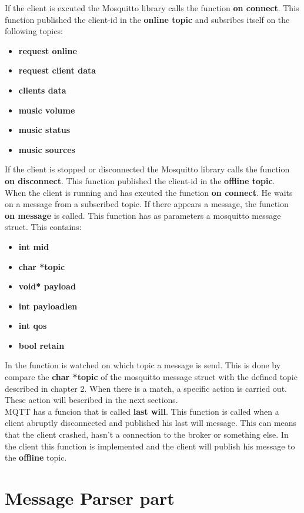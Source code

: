 If the client is excuted the Mosquitto library calls the function  
{\bf on connect}. This function published the client-id in the {\bf online topic } and subsribes itself on the following topics:
\small{
\begin{itemize} [noitemsep, nolistsep]
	\item {\bf request online}
	\item {\bf request client data}
	\item {\bf clients data}
	\item {\bf music volume}
	\item {\bf music status}
	\item {\bf music sources\\}
\end{itemize}
}
If the client is stopped or disconnected the Mosquitto library calls the function {\bf on disconnect}. This function published the client-id in the {\bf offline topic}.\\

When the client is running and has excuted the function {\bf on connect}. He waits on a message from a subscribed topic. If there appears a message, the function {\bf on message} is called. This function has as parameters a mosquitto message struct. This contains: 
\small{
\begin{itemize} [noitemsep, nolistsep]
	\item {\bf int mid}
	\item {\bf char *topic}
	\item {\bf void* payload}
	\item {\bf int payloadlen}
	\item {\bf int qos}
	\item {\bf bool retain\\}
\end{itemize}
}

In the function is watched on which topic a message is send. This is done by compare the {\bf char *topic} of the mosquitto message struct with the defined topic described in chapter 2. When there is a match, a specific action is carried out. These action will bescribed in the next sections.\\

MQTT has a funcion that is called {\bf last will}. This function is called when a client abruptly disconnected and published his last will message. This can means that the client crashed, hasn't a connection to the broker or something else. In the client this function is implemented and the client will publish his message to the {\bf offline} topic.

\section{Message Parser part}







